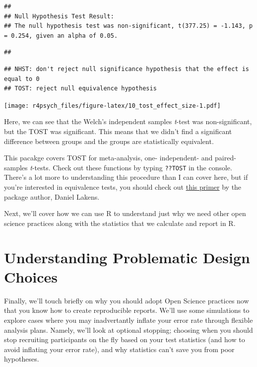 \documentclass[
]{book}
\begin{document}
\begin{verbatim}
## 
## Null Hypothesis Test Result:
## The null hypothesis test was non-significant, t(377.25) = -1.143, p = 0.254, given an alpha of 0.05.
\end{verbatim}

\begin{verbatim}
## 
\end{verbatim}

\begin{verbatim}
## NHST: don't reject null significance hypothesis that the effect is equal to 0 
## TOST: reject null equivalence hypothesis
\end{verbatim}

\texttt{[image: r4psych\_files/figure-latex/10\_tost\_effect\_size-1.pdf]}

Here, we can see that the Welch's independent samples \emph{t}-test was non-significant, but the TOST was significant. This means that we didn't find a significant difference between groups and the groups are statistically equivalent.

This pacakge covers TOST for meta-analysis, one- independent- and paired-samples \emph{t}-tests. Check out these functions by typing \texttt{??TOST} in the console. There's a lot more to understanding this procedure than I can cover here, but if you're interested in equivalence tests, you should check out \href{http://journals.sagepub.com/doi/abs/10.1177/1948550617697177}{this primer} by the package author, Daniel Lakens.

Next, we'll cover how we can use R to understand just why we need other open science practices along with the statistics that we calculate and report in R.

\hypertarget{understanding-problematic-design-choices}{%
\section{Understanding Problematic Design Choices}\label{understanding-problematic-design-choices}}

Finally, we'll touch briefly on why you should adopt Open Science practices now that you know how to create reproducible reports. We'll use some simulations to explore cases where you may inadvertantly inflate your error rate through flexible analysis plans. Namely, we'll look at optional stopping; choosing when you should stop recruiting participants on the fly based on your test statistics (and how to avoid inflating your error rate), and why statistics can't save you from poor hypotheses.
\end{document}
